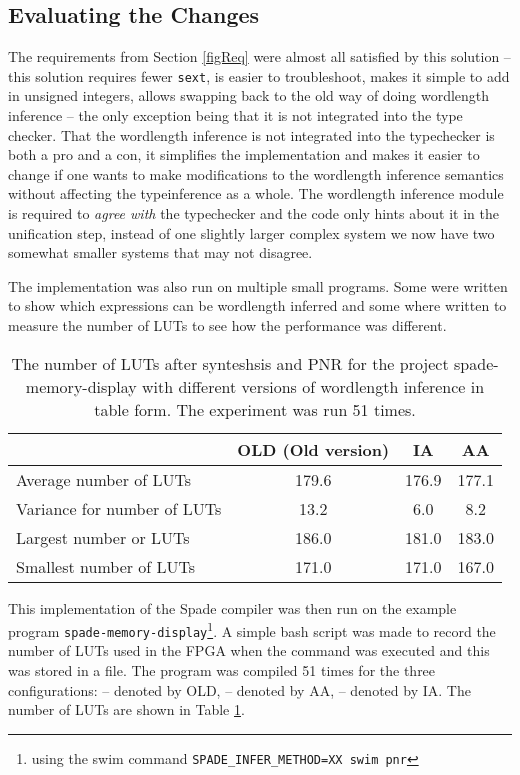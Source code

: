\subsection{Evaluating the Changes}
The requirements from Section \ref{figReq} were almost all satisfied by this solution -- this solution requires fewer \verb+sext+, is easier to troubleshoot, makes it simple to add in unsigned integers, allows swapping back to the old way of doing wordlength inference -- the only exception being that it is not integrated into the type checker. That the wordlength inference is not integrated into the typechecker is both a pro and a con, it simplifies the implementation and makes it easier to change if one wants to make modifications to the wordlength inference semantics without affecting the typeinference as a whole. The wordlength inference module is required to \textit{agree with} the typechecker and the code only hints about it in the unification step, instead of one slightly larger complex system we now have two somewhat smaller systems that may not disagree.

The implementation was also run on multiple small programs. Some were written to show which expressions can be wordlength inferred and some where written to measure the number of LUTs to see how the performance was different. 

\begin{table}[h!]
\begin{center}
\begin{tabular}{l | c c c}
  & OLD (Old version) & IA & AA \\
\hline
Average number of LUTs&179.6&176.9 & 177.1 \\
Variance for number of LUTs &13.2&6.0&8.2 \\
Largest number or LUTs&186.0&181.0&183.0 \\
Smallest number of LUTs&171.0&171.0&167.0 \\
\end{tabular}
  \caption{The number of LUTs after synteshsis and PNR for the project spade-memory-display with different versions of wordlength inference in table form. The experiment was run 51 times.}
  \label{fig:SpadeCompilations50Table}
\end{center}
\end{table}

This implementation of the Spade compiler was then run on the example program \verb+spade-memory-display+\cprotect\footnote{using the swim command \verb+SPADE_INFER_METHOD=XX swim pnr+}. A simple bash script was made to record the number of LUTs used in the FPGA when the command was executed and this was stored in a file. The program was compiled 51 times for the three configurations:  -- denoted by OLD,  -- denoted by AA,  -- denoted by IA. The number of LUTs are shown in Table \ref{fig:SpadeCompilations50Table}.

